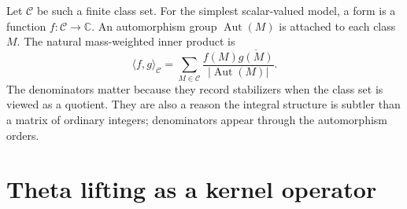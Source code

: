 \documentclass[11pt,openany,oneside]{scrbook}
\theoremstyle{definition}
\theoremstyle{remark}
\newcommand{\CC}{\mathbb C}
\begin{document}
Let $\mathcal C$ be such a finite class set. For the simplest scalar-valued model, a form is a function $f:\mathcal C\to\CC$. An automorphism group $\operatorname{Aut}(M)$ is attached to each class $M$. The natural mass-weighted inner product is
\begin{equation}\label{eq:massip}
\langle f,g\rangle_{\mathcal C}
=\sum_{M\in\mathcal C}\frac{f(M)\overline{g(M)}}{|\operatorname{Aut}(M)|}.
\end{equation}
The denominators matter because they record stabilizers when the class set is viewed as a quotient. They are also a reason the integral structure is subtler than a matrix of ordinary integers; denominators appear through the automorphism orders.

\section{Theta lifting as a kernel operator}
\end{document}

